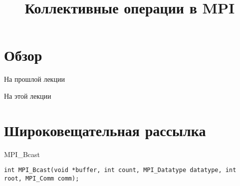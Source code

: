 

\title{Коллективные операции в MPI}



\begin{frame}
\titlepage
\end{frame}

\section*{Обзор}

\begin{frame}{На прошлой лекции}
\end{frame}

\begin{frame}{На этой лекции}
\tableofcontents
\end{frame} 


\section{Широковещательная рассылка}

\begin{frame}[fragile]{MPI_Bcast}

\begin{lstlisting}
int MPI_Bcast(void *buffer, int count, MPI_Datatype datatype, int root, MPI_Comm comm);
\end{lstlisting}

\end{frame}

